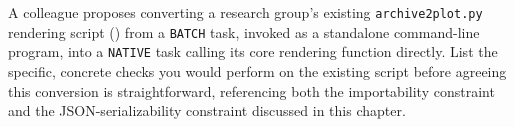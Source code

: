 \begin{exercise}
A colleague proposes converting a research group's existing
\texttt{archive2plot.py} rendering script () from a
\texttt{BATCH} task, invoked as a standalone command-line program, into a
\texttt{NATIVE} task calling its core rendering function directly. List the
specific, concrete checks you would perform on the existing script before
agreeing this conversion is straightforward, referencing both the
importability constraint and the JSON-serializability constraint discussed
in this chapter.
\end{exercise}
